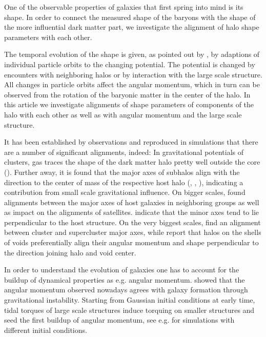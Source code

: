 \documentclass[useAMS,usenatbib]{mn2e}
\begin{document}
%
%
%
%
One of the observable properties of galaxies that first spring into mind is
its shape. In order to connect the measured shape of the baryons with the
shape of the more influential dark matter part, we investigate the alignment
of halo shape parameters with each other.

The temporal evolution of the shape is given, as pointed out by
\cite{Valluri2010}, by adaptions of individual particle orbits to the changing
potential. The potential is changed by encounters with neighboring halos or by
interaction with the large scale structure. All changes in particle orbits
affect the angular momentum, which in turn can be observed from the rotation
of the baryonic matter in the center of the halo. In this article we
investigate alignments of shape parameters of components of the halo with each
other as well as with angular momentum and the large scale structure.

It has been established by observations and reproduced in simulations that
there are a number of significant alignments, indeed: In gravitational
potentials of clusters, gas traces the shape of the dark matter halo pretty
well outside the core (\cite{Lau2010}). Further away, it is found that the
major axes of subhalos align with the direction to the center of mass of the
respective host halo (\cite{Yang2006}, \cite{Faltenbacher2007},
\cite{Faltenbacher2008}), indicating a contribution from small scale
gravitational influence. On bigger scales, \cite{Wang2008} found alignments
between the major axes of host galaxies in neighboring groups as well as
impact on the alignments of satellites. \cite{Aragon-Calvo2007} indicate that
the minor axes tend to lie perpendicular to the host structure. On the very
biggest scales, \cite{Basilakos2006} find an alignment between cluster and
supercluster major axes, while \cite{Cuesta2008} report that halos on the
shells of voids preferentially align their angular momentum and shape
perpendicular to the direction joining halo and void center.

%
In order to understand the evolution of galaxies one has to account for the
buildup of dynamical properties as e.g. angular momentum. \cite{Peebles1969}
showed that the angular momentum observed nowadays agrees with galaxy
formation through gravitational instability. Starting from Gaussian initial
conditions at early time, tidal torques of large scale structures induce
torquing on smaller structures and seed the first buildup of angular momentum,
see e.g. \cite{Barnes1987} for simulations with different initial conditions.
\end{document}
